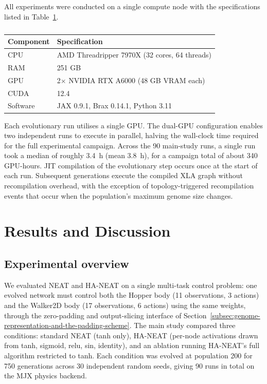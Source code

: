 All experiments were conducted on a single compute node with the specifications listed in Table~\ref{tab:compute-node}.

\begin{table}[h]
\centering
\caption[Compute node]{}
\label{tab:compute-node}
\begin{tabular}{ll}
\toprule
\textbf{Component} & \textbf{Specification} \\
\midrule
CPU & AMD Threadripper 7970X (32 cores, 64 threads) \\
RAM & 251 GB \\
GPU & 2$\times$ NVIDIA RTX A6000 (48 GB VRAM each) \\
CUDA & 12.4 \\
Software & JAX 0.9.1, Brax 0.14.1, Python 3.11 \\
\bottomrule
\end{tabular}
\end{table}

Each evolutionary run utilises a single GPU.
The dual-GPU configuration enables two independent runs to execute in parallel, halving the wall-clock time required for the full experimental campaign.
Across the 90 main-study runs, a single run took a median of roughly 3.4~h (mean 3.8~h), for a campaign total of about 340 GPU-hours.
JIT compilation of the evolutionary step occurs once at the start of each run. Subsequent generations execute the compiled XLA graph without recompilation overhead, with the exception of topology-triggered recompilation events that occur when the population's maximum genome size changes.

\newpage

\chapter{Results and Discussion}
\label{sec:results-and-discussion}

\section{Experimental overview}
\label{subsec:experimental-overview}
We evaluated NEAT and HA-NEAT on a single multi-task control problem: one evolved network must control both the Hopper body (11 observations, 3 actions) and the Walker2D body (17 observations, 6 actions) using the same weights, through the zero-padding and output-slicing interface of Section~\ref{subsec:genome-representation-and-the-padding-scheme}.
The main study compared three conditions: standard NEAT (tanh only), HA-NEAT (per-node activations drawn from tanh, sigmoid, relu, sin, identity), and an ablation running HA-NEAT's full algorithm restricted to tanh.
Each condition was evolved at population 200 for 750 generations across 30 independent random seeds, giving 90 runs in total on the MJX physics backend.

